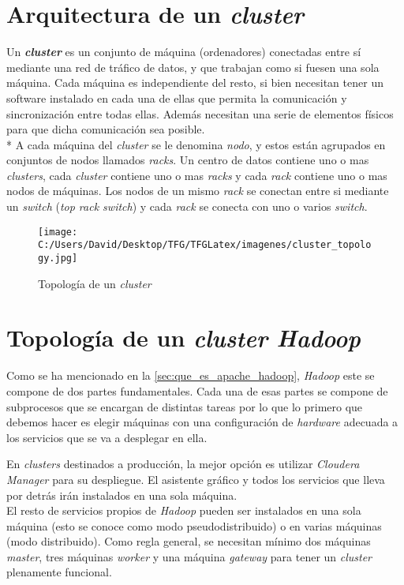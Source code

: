 \clearpage

\section{Arquitectura de un \textit{cluster}}\label{sec:arquitectura_cluster}
Un \textbf{\textit{cluster}} es un conjunto de máquina (ordenadores) conectadas entre sí mediante 
una red de tráfico de datos, y que trabajan como si fuesen una sola máquina.
Cada máquina es independiente del resto, si bien necesitan tener un software instalado en cada una de ellas
que permita la comunicación y sincronización entre todas ellas. Además necesitan una serie de elementos
físicos para que dicha comunicación sea posible.\\*
A cada máquina del \textit{cluster} se le denomina \textit{nodo}, y estos están agrupados en 
conjuntos de nodos llamados \textit{racks}.
Un centro de datos contiene uno o mas \textit{clusters}, cada \textit{cluster} contiene 
uno o mas \textit{racks} y cada \textit{rack} contiene uno o mas nodos de máquinas. 
Los nodos de un mismo \textit{rack} se conectan entre si mediante un \textit{switch} 
(\textit{top rack switch}) y cada \textit{rack} se conecta con uno o varios \textit{switch}.

\begin{figure}[h]
  \centering
  \texttt{[image: C:/Users/David/Desktop/TFG/TFGLatex/imagenes/cluster\_topology.jpg]}
  \caption[Topología de un \textit{cluster}]{Topología de un \textit{cluster}}
  \label{cluster_topology}
\end{figure}

\clearpage


\section{Topología de un \textit{cluster Hadoop}}
Como se ha mencionado en la \autoref{sec:que_es_apache_hadoop}, \textit{Hadoop} este se compone de dos partes 
fundamentales. Cada una de esas partes se compone de subprocesos que se encargan de distintas tareas por lo que
lo primero que debemos hacer es elegir máquinas con una configuración de \textit{hardware} 
adecuada a los servicios que se va a desplegar en ella.

En \textit{clusters} destinados a producción, la mejor opción es utilizar \textit{Cloudera Manager} para
su despliegue. El asistente gráfico y todos los servicios que lleva por detrás irán instalados en una
sola máquina. \\
El resto de servicios propios de \textit{Hadoop} pueden ser instalados en una sola máquina (esto se conoce 
como modo pseudodistribuido) o en varias máquinas (modo distribuido).
Como regla general, se necesitan mínimo dos máquinas \textit{master}, tres máquinas \textit{worker} y una
máquina \textit{gateway} para tener un \textit{cluster} plenamente funcional.
\newline

